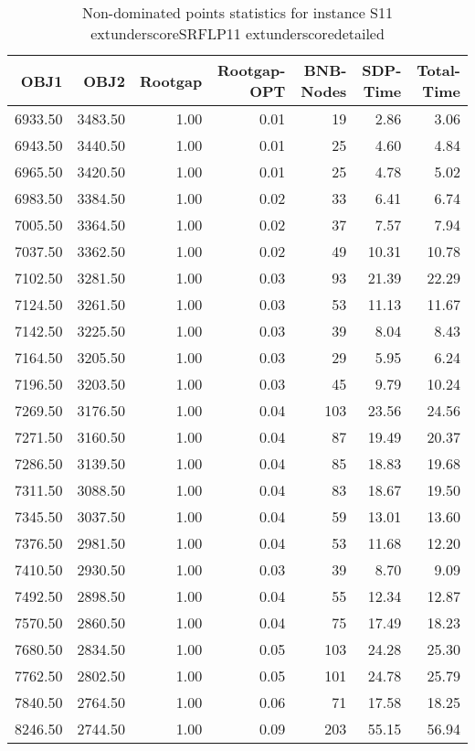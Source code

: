 \begin{table}
\caption{Non-dominated points statistics for instance S11	extunderscoreSRFLP11	extunderscoredetailed}
\label{tab:stats/S11_SRFLP11_detailed}
\begin{tabular}{rrrrrrr}
\toprule
OBJ1 & OBJ2 & Rootgap & Rootgap-OPT & BNB-Nodes & SDP-Time & Total-Time \\
\midrule
6933.50 & 3483.50 & 1.00 & 0.01 & 19 & 2.86 & 3.06 \\
6943.50 & 3440.50 & 1.00 & 0.01 & 25 & 4.60 & 4.84 \\
6965.50 & 3420.50 & 1.00 & 0.01 & 25 & 4.78 & 5.02 \\
6983.50 & 3384.50 & 1.00 & 0.02 & 33 & 6.41 & 6.74 \\
7005.50 & 3364.50 & 1.00 & 0.02 & 37 & 7.57 & 7.94 \\
7037.50 & 3362.50 & 1.00 & 0.02 & 49 & 10.31 & 10.78 \\
7102.50 & 3281.50 & 1.00 & 0.03 & 93 & 21.39 & 22.29 \\
7124.50 & 3261.50 & 1.00 & 0.03 & 53 & 11.13 & 11.67 \\
7142.50 & 3225.50 & 1.00 & 0.03 & 39 & 8.04 & 8.43 \\
7164.50 & 3205.50 & 1.00 & 0.03 & 29 & 5.95 & 6.24 \\
7196.50 & 3203.50 & 1.00 & 0.03 & 45 & 9.79 & 10.24 \\
7269.50 & 3176.50 & 1.00 & 0.04 & 103 & 23.56 & 24.56 \\
7271.50 & 3160.50 & 1.00 & 0.04 & 87 & 19.49 & 20.37 \\
7286.50 & 3139.50 & 1.00 & 0.04 & 85 & 18.83 & 19.68 \\
7311.50 & 3088.50 & 1.00 & 0.04 & 83 & 18.67 & 19.50 \\
7345.50 & 3037.50 & 1.00 & 0.04 & 59 & 13.01 & 13.60 \\
7376.50 & 2981.50 & 1.00 & 0.04 & 53 & 11.68 & 12.20 \\
7410.50 & 2930.50 & 1.00 & 0.03 & 39 & 8.70 & 9.09 \\
7492.50 & 2898.50 & 1.00 & 0.04 & 55 & 12.34 & 12.87 \\
7570.50 & 2860.50 & 1.00 & 0.04 & 75 & 17.49 & 18.23 \\
7680.50 & 2834.50 & 1.00 & 0.05 & 103 & 24.28 & 25.30 \\
7762.50 & 2802.50 & 1.00 & 0.05 & 101 & 24.78 & 25.79 \\
7840.50 & 2764.50 & 1.00 & 0.06 & 71 & 17.58 & 18.25 \\
8246.50 & 2744.50 & 1.00 & 0.09 & 203 & 55.15 & 56.94 \\

\end{tabular}
\end{table}
